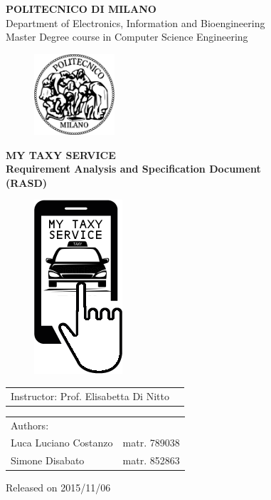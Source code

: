 \documentclass[a4paper]{report}
\begin{document}
\begin{titlepage}

\begin{center}
\LARGE
\textbf{POLITECNICO DI MILANO} \\
\Large
Department of Electronics, Information and Bioengineering \\
Master Degree course in Computer Science Engineering
\end{center}

\addvspace{1.5cm}
\begin{figure}[h]
\begin{center}
\includegraphics[width=3cm]{figures/PoliMi}
\end{center}
\end{figure}

\addvspace{0.75cm}
\begin{center}
\LARGE
\textbf{MY TAXY SERVICE \\ Requirement Analysis and Specification Document \\ (RASD)}
\begin{figure}[h]
	\centerline{\includegraphics[scale = 0.5]{figures/logo3.png}}
\end{figure}
\end{center}


\Large
\begin{tabular}{p{}p{}}
Instructor: Prof. Elisabetta Di Nitto & \\
\end{tabular}

\addvspace{1cm}

\Large
\begin{tabular}{p{}p{}}
Authors: & \\
Luca Luciano Costanzo & matr. 789038 \\
Simone Disabato & matr. 852863 
\end{tabular}

\addvspace{2cm}
\Large
\begin{center}
Released on 2015/11/06
\end{center}

\end{titlepage}
\end{document}
